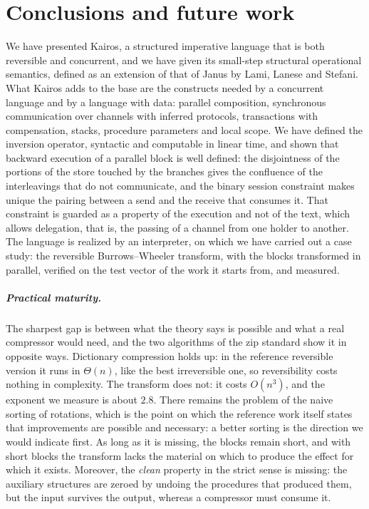 \chapter{Conclusions and future work}
\label{chap:conclusioni}
\label{sec:concl}

We have presented Kairos, a structured imperative language that is both
reversible and concurrent, and we have given its small-step structural
operational semantics, defined as an extension of that of Janus by
Lami, Lanese and Stefani. What Kairos adds to the base are the constructs
needed by a concurrent language and by a language with data: parallel
composition, synchronous communication over channels with inferred protocols, transactions with
compensation, stacks, procedure parameters and local scope. We have defined
the inversion operator, syntactic and computable in linear time, and shown
that backward execution of a parallel block is well defined: the
disjointness of the portions of the store touched by the branches gives the confluence of
the interleavings that do not communicate, and the binary session constraint makes unique
the pairing between a send and the receive that consumes it. That constraint is
guarded as a property of the execution and not of the text, which allows
delegation, that is, the passing of a channel from one holder to another. The language
is realized by an interpreter, on which we have carried out a case study:
the reversible Burrows--Wheeler transform, with the blocks transformed in
parallel, verified on the test vector of the work it starts from, and measured.

\paragraph{Practical maturity.} The sharpest gap is between what the theory says
is possible and what a real compressor would need, and the two algorithms of the
zip standard show it in opposite ways. Dictionary compression holds up:
in the reference reversible version it runs in $\Theta(n)$, like the best
irreversible one, so reversibility costs nothing in complexity. The
transform does not: it costs $O(n^3)$, and the exponent we measure is about $2.8$.
There remains the problem of the naive sorting of rotations, which is the point on which the
reference work itself states that improvements are possible and
necessary: a better sorting is the direction we would indicate first.
As long as it is missing, the blocks remain short, and with short blocks the transform lacks
the material on which to produce the effect for which it exists. Moreover, the
\emph{clean} property in the strict sense is missing: the auxiliary structures are zeroed
by undoing the procedures that produced them, but the input survives
the output, whereas a compressor must consume it.

